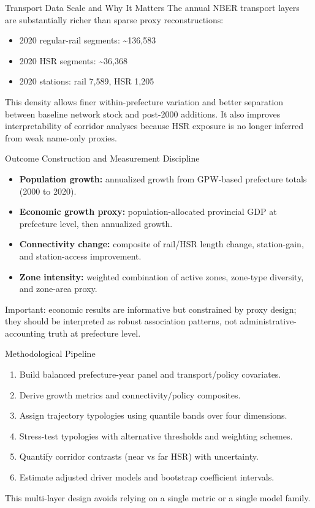 \documentclass[aspectratio=169]{beamer}
\begin{document}
\begin{frame}{Transport Data Scale and Why It Matters}
\small
The annual NBER transport layers are substantially richer than sparse proxy reconstructions:
\begin{itemize}
  \item 2020 regular-rail segments: \textasciitilde136{,}583
  \item 2020 HSR segments: \textasciitilde36{,}368
  \item 2020 stations: rail 7{,}589, HSR 1{,}205
\end{itemize}
\vspace{0.2em}
This density allows finer within-prefecture variation and better separation between baseline network stock and post-2000 additions.
\vspace{0.2em}
It also improves interpretability of corridor analyses because HSR exposure is no longer inferred from weak name-only proxies.
\end{frame}

\begin{frame}{Outcome Construction and Measurement Discipline}
\small
\begin{itemize}
  \item \textbf{Population growth:} annualized growth from GPW-based prefecture totals (2000 to 2020).
  \item \textbf{Economic growth proxy:} population-allocated provincial GDP at prefecture level, then annualized growth.
  \item \textbf{Connectivity change:} composite of rail/HSR length change, station-gain, and station-access improvement.
  \item \textbf{Zone intensity:} weighted combination of active zones, zone-type diversity, and zone-area proxy.
\end{itemize}
\vspace{0.3em}
Important: economic results are informative but constrained by proxy design; they should be interpreted as robust association patterns, not administrative-accounting truth at prefecture level.
\end{frame}

\begin{frame}{Methodological Pipeline}
\small
\begin{enumerate}
  \item Build balanced prefecture-year panel and transport/policy covariates.
  \item Derive growth metrics and connectivity/policy composites.
  \item Assign trajectory typologies using quantile bands over four dimensions.
  \item Stress-test typologies with alternative thresholds and weighting schemes.
  \item Quantify corridor contrasts (near vs far HSR) with uncertainty.
  \item Estimate adjusted driver models and bootstrap coefficient intervals.
\end{enumerate}
\vspace{0.3em}
This multi-layer design avoids relying on a single metric or a single model family.
\end{frame}
\end{document}
